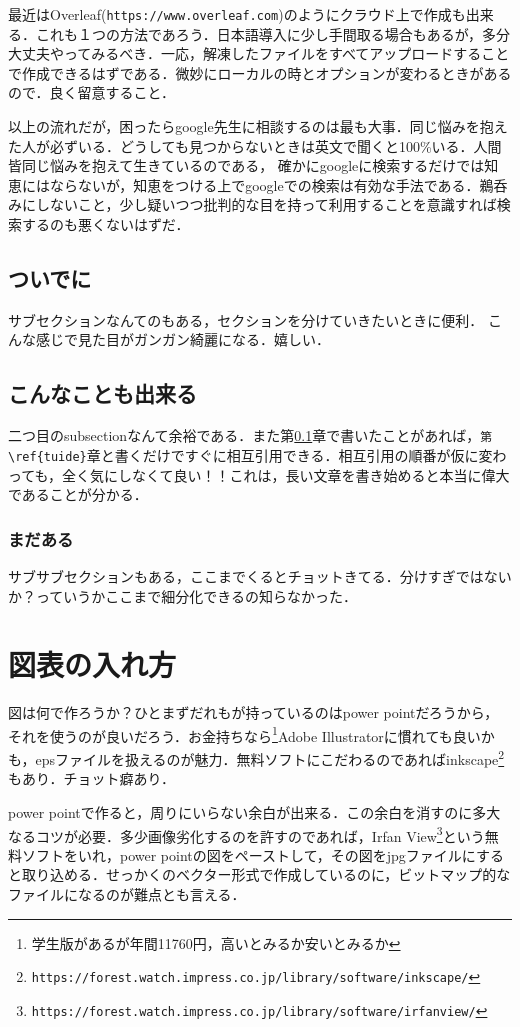 \documentclass[12 pt,a4paper,autodetect-engine]{jsarticle}
\begin{document}
最近はOverleaf(\verb|https://www.overleaf.com|)のようにクラウド上で作成も出来る．これも１つの方法であろう．日本語導入に少し手間取る場合もあるが，多分大丈夫やってみるべき．一応，解凍したファイルをすべてアップロードすることで作成できるはずである．微妙にローカルの時とオプションが変わるときがあるので．良く留意すること．

以上の流れだが，困ったらgoogle先生に相談するのは最も大事．同じ悩みを抱えた人が必ずいる．どうしても見つからないときは英文で聞くと100\%いる．人間皆同じ悩みを抱えて生きているのである，
確かにgoogleに検索するだけでは知恵にはならないが，知恵をつける上でgoogleでの検索は有効な手法である．鵜呑みにしないこと，少し疑いつつ批判的な目を持って利用することを意識すれば検索するのも悪くないはずだ．


\subsection{ついでに}\label{tuide}
サブセクションなんてのもある，セクションを分けていきたいときに便利．
こんな感じで見た目がガンガン綺麗になる．嬉しい．

\subsection{こんなことも出来る}
二つ目のsubsectionなんて余裕である．また第\ref{tuide}章で書いたことがあれば，\verb|第\ref{tuide}|章と書くだけですぐに相互引用できる．相互引用の順番が仮に変わっても，全く気にしなくて良い！！これは，長い文章を書き始めると本当に偉大であることが分かる．

\subsubsection{まだある}
サブサブセクションもある，ここまでくるとチョットきてる．分けすぎではないか？っていうかここまで細分化できるの知らなかった．


\section{図表の入れ方}
図は何で作ろうか？ひとまずだれもが持っているのはpower pointだろうから，それを使うのが良いだろう．お金持ちなら\footnote{学生版があるが年間11760円，高いとみるか安いとみるか}Adobe Illustratorに慣れても良いかも，epsファイルを扱えるのが魅力．無料ソフトにこだわるのであればinkscape\footnote{\verb|https://forest.watch.impress.co.jp/library/software/inkscape/|}もあり．チョット癖あり．

power pointで作ると，周りにいらない余白が出来る．この余白を消すのに多大なるコツが必要．多少画像劣化するのを許すのであれば，Irfan View\footnote{\verb|https://forest.watch.impress.co.jp/library/software/irfanview/|}という無料ソフトをいれ，power pointの図をペーストして，その図をjpgファイルにすると取り込める．せっかくのベクター形式で作成しているのに，ビットマップ的なファイルになるのが難点とも言える．
\end{document}
